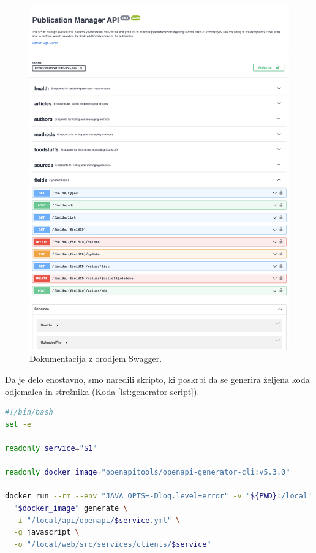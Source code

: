 \documentclass[a4paper, 12pt]{book}
\begin{document}
\newpage
\begin{figure}[h]
\begin{center}
\includegraphics[width=1\textwidth]{slike/documentation.png}
\end{center}
\caption{ Dokumentacija z orodjem Swagger. }
\label{swagger-docs}
\end{figure}
\clearpage


Da je delo enostavno, smo naredili skripto, ki poskrbi da se generira željena koda odjemalca in strežnika (Koda \ref{lst:generator-script}).
\begin{lstlisting}[language=bash, style=mystyle, caption={Skripta, ki poskrbi za generiranje kode za posamezno storitev},label=lst:generator-script]
#!/bin/bash
set -e

readonly service="$1"

readonly docker_image="openapitools/openapi-generator-cli:v5.3.0"

docker run --rm --env "JAVA_OPTS=-Dlog.level=error" -v "${PWD}:/local" \
  "$docker_image" generate \
  -i "/local/api/openapi/$service.yml" \
  -g javascript \
  -o "/local/web/src/services/clients/$service"
\end{lstlisting}
    
\end{document}
